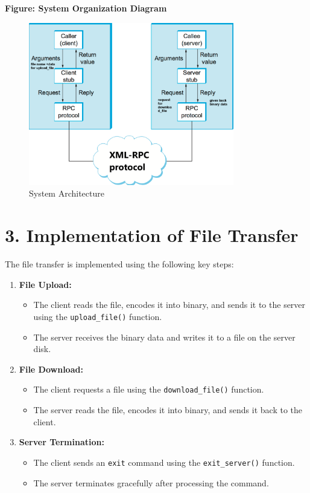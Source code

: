 \documentclass[a4paper,12pt]{article}
\begin{document}
\noindent \textbf{Figure: System Organization Diagram}
\begin{figure}[h!]
    \centering
    \includegraphics[width=0.8\textwidth]{design.png} 
    \caption{System Architecture}
\end{figure}

\section*{3. Implementation of File Transfer}
The file transfer is implemented using the following key steps:
\begin{enumerate}
    \item \textbf{File Upload:}
    \begin{itemize}
        \item The client reads the file, encodes it into binary, and sends it to the server using the \texttt{upload\_file()} function.
        \item The server receives the binary data and writes it to a file on the server disk.
    \end{itemize}
    \item \textbf{File Download:}
    \begin{itemize}
        \item The client requests a file using the \texttt{download\_file()} function.
        \item The server reads the file, encodes it into binary, and sends it back to the client.
    \end{itemize}
    \item \textbf{Server Termination:}
    \begin{itemize}
        \item The client sends an \texttt{exit} command using the \texttt{exit\_server()} function.
        \item The server terminates gracefully after processing the command.
    \end{itemize}
\end{enumerate}
\end{document}
